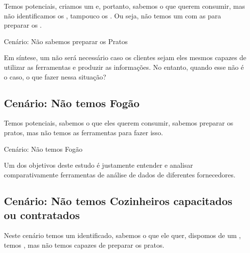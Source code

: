     Temos \CLIENTES \xspace potenciais, criamos um \CARDAPIO \xspace e, portanto, sabemos o que querem consumir, mas não identificamos os \INGREDIENTES, tampouco os \PRODUTORES. Ou seja, não temos um \LIVRODERECEITAS  \xspace com as \RECEITAS  \xspace para preparar os \PRATOS.
    
    \begin{env-cenario}{Cenário: Não sabemos preparar os Pratos}
            \mschecksim \xspace \CLIENTE 
            
            \mschecksim \xspace \CARDAPIO

            \mschecknao \xspace \LIVRODERECEITAS
    \end{env-cenario}
    
    Em síntese, um \LIVRODERECEITAS \xspace não será necessário caso os clientes sejam eles mesmos capazes de utilizar as ferramentas e produzir as informações. No entanto, quando esse não é o caso, o que fazer nessa situação?

\subsection{Cenário: Não temos Fogão}

    Temos \CLIENTES \xspace potenciais, sabemos o que eles querem consumir, sabemos preparar os pratos, mas não temos as ferramentas para fazer isso.

    \begin{env-cenario}{Cenário: Não temos Fogão}
            \mschecksim \xspace \CLIENTE 
            
            \mschecksim \xspace \CARDAPIO  

            \mschecksim \xspace \LIVRODERECEITAS
            
            \mschecknao \xspace \FOGAO
    \end{env-cenario}

    Um dos objetivos deste estudo é justamente entender e analisar comparativamente ferramentas de análise de dados de diferentes fornecedores.


\subsection{Cenário: Não temos Cozinheiros capacitados ou contratados}    

    Neste cenário temos um \CLIENTE \xspace identificado, sabemos o que ele quer, dispomos de um \LIVRODERECEITAS, temos \FOGAO, mas não temos \COZINHEIROS \xspace capazes de preparar os pratos.

